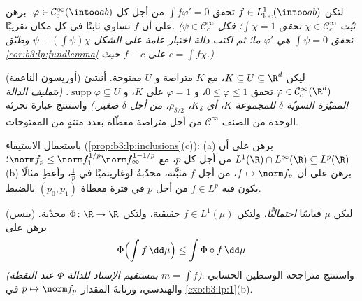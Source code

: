 \begin{exercise}[$\star\star$]\label{exo:b3:lp:7}
لتكن $f \in L^1_{\mathrm{loc}}(\intoo ab)$ تحقق $\int f\varphi' = 0$ من أجل كل $\varphi \in \mathcal
C^\infty_c(\intoo ab)$. برهن على أن $f$
تساوي ثابتًا في كل مكان تقريبًا. \emph{(ثبّت $\chi \in \mathcal C_c^\infty$ تحقق
$\int\chi = 1$؛ فكل $\psi \in \mathcal C_c^\infty$ تحقق $\int\psi = 0$ هي $\varphi'$
ما؛ ثم اكتب دالة اختبار عامة على الشكل $\psi + (\int\psi)\chi$ وطبّق
\cref{cor:b3:lp:fundlemma} على $f - c$ حيث $c = \int
f\chi$.)}
\end{exercise}

\begin{exercise}[$\star\star\star$]\label{exo:b3:lp:8}
(أوريسون الناعمة) ليكن $K \subseteq U \subseteq \R^d$، مع $K$ متراصة و $U$ مفتوحة.
أنشئ $\varphi \in \mathcal
C^\infty_c(\R^d)$ تحقق $0 \leq \varphi \leq 1$، و $\varphi = 1$ على $K$، و $\operatorname{supp}\varphi \subseteq U$.
\emph{(بتمليف الدالة المميّزة  السويّة $\delta$ للمجموعة
$K$، أي $K_\delta$،  $\rho_{\delta/2}$، من أجل $\delta$ صغير.)}
واستنتج عبارة تجزئة الوحدة من الصنف $\mathcal C^\infty$ من أجل متراصة
مغطّاة بعدد منتهٍ من المفتوحات.
\end{exercise}

\begin{exercise}[$\star\star$]\label{exo:b3:lp:9}
باستعمال الاستيفاء (\cref{prop:b3:lp:inclusions}(c)):
(a) برهن على أن $L^1(\R)\cap L^\infty(\R) \subseteq L^p(\R)$ من أجل كل $p$، مع $\norm f_p \leq \norm f_1^{1/p}\norm
f_\infty^{1 - 1/p}$؛
(b) برهن على أن $f \mapsto \norm f_p$، من أجل $f$ مثبَّتة، محدّبةٌ لوغاريتميًا
في $\frac1p$، وأعطِ مثالًا يكون فيه $f \in L^p$ من أجل $p$
في فترة معطاة $(p_0, p_1)$ بالضبط.
\end{exercise}

\begin{exercise}[$\star\star$]\label{exo:b3:lp:10}
(ينسن) ليكن $\mu$ قياسًا \emph{احتماليًّا}، ولتكن $f \in
L^1(\mu)$
حقيقية، ولتكن $\Phi \colon \R \to \R$ محدّبة. برهن على
\[
\Phi\Bigl(\int f\,\dd\mu\Bigr) \leq \int \Phi\circ
f\,\dd\mu
\]
\emph{(بمستقيم الإسناد للدالة $\Phi$ عند النقطة $m = \int f$)}.
واستنتج متراجحة الوسطين الحسابي والهندسي، ورتابةَ المقدار
$p \mapsto \norm f_p$ في \cref{exo:b3:lp:1}(b).
\end{exercise}

